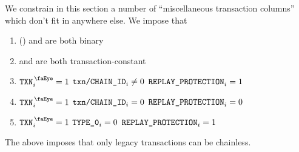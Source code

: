 We constrain in this section a number of ``miscellaneous transaction columns'' which don't fit in anywhere else.
We impose that
\begin{enumerate}
    \item \rlpTxnCommonColumnReplayProtection{} (\sanityCheck) and \rlpTxnCommonColumnYparity{} are both binary
    \item \rlpTxnCommonColumnReplayProtection{} and \rlpTxnCommonColumnYparity{} are both transaction-constant
    \item \If $\isTxn _{i} = 1$ \et $\texttt{txn}\texttt{/}\texttt{{CHAIN\_ID}} _{i} \neq 0$ \Then $\texttt{REPLAY\_PROTECTION} _{i} = 1$
    \item \If $\isTxn _{i} = 1$ \et $\texttt{txn}\texttt{/}\texttt{{CHAIN\_ID}} _{i} =    0$ \Then $\texttt{REPLAY\_PROTECTION} _{i} = 0$
    \item \If $\isTxn _{i} = 1$ \et $\texttt{TYPE\_0}                     _{i} =    0$ \Then $\texttt{REPLAY\_PROTECTION} _{i} = 1$
\end{enumerate}
\saNote{} \label{rlp txn v2: generalities: transaction decoding: non legacy transaction can't be chainless}
The above imposes that only legacy transactions can be chainless.
